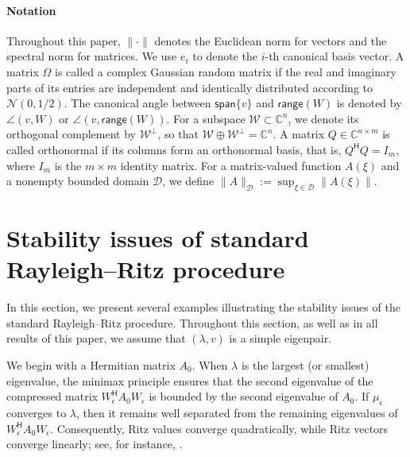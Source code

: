 \documentclass[a4paper,11pt]{article}
\newcommand{\Htran}{\mathsf{H}}
\newcommand{\C}{\mathbb{C}}
\newcommand{\region}{\mathcal{D}}
\newcommand{\range}{\mathsf{range}}
\providecommand{\spa}[1]{\mathsf{span}\{#1\}}
\providecommand{\norm}[1]{\lVert#1\rVert}
\begin{document}
\paragraph{Notation}
Throughout this paper, $\norm{\cdot}$ denotes the Euclidean norm for vectors and the spectral norm for matrices.
We use $e_{i}$ to denote the $i$-th canonical basis vector.
A matrix $\Omega$ is called a complex Gaussian random matrix if the real and imaginary parts of its entries are independent and identically distributed according to $\mathcal{N}(0,1/2)$.
The canonical angle between $\spa{v}$ and $\range(W)$ is denoted by $\angle(v,W)$ or $\angle(v,\range(W))$.
For a subspace $\mathcal{W}\subset\C^{n}$, we denote its orthogonal complement by $\mathcal{W}^{\perp}$, so that $\mathcal{W}\oplus \mathcal{W}^{\perp} = \C^{n}$.
A matrix $Q\in\C^{n\times m}$ is called orthonormal if its columns form an orthonormal basis, that is, $Q^{\Htran}Q = I_{m}$, where $I_{m}$ is the $m\times m$ identity matrix.
For a matrix-valued function $A(\xi)$ and a nonempty bounded domain $\region$, we define $
\norm{A}_{\region} := \sup_{\xi\in\region}\norm{A(\xi)}$.




\section{Stability issues of standard Rayleigh--Ritz procedure}
\label{sec:stab}
In this section, we present several examples illustrating the stability issues of the standard Rayleigh--Ritz procedure. Throughout this section, as well as in all results of this paper, we assume that $(\lambda, v)$ is a simple eigenpair.

We begin with a Hermitian matrix $A_{0}$. When $\lambda$ is the largest (or smallest) eigenvalue, the minimax principle ensures that the second eigenvalue of the compressed matrix $W_{\epsilon}^{\Htran} A_{0} W_{\epsilon}$ is bounded by the second eigenvalue of $A_{0}$. If $\mu_{\epsilon}$ converges to $\lambda$, then it remains well separated from the remaining eigenvalues of $W_{\epsilon}^{\Htran} A_{0} W_{\epsilon}$. Consequently, Ritz values converge quadratically, while Ritz vectors converge linearly; see, for instance, \cite[Sec.~4.3.2]{Saad2011}.
\end{document}
